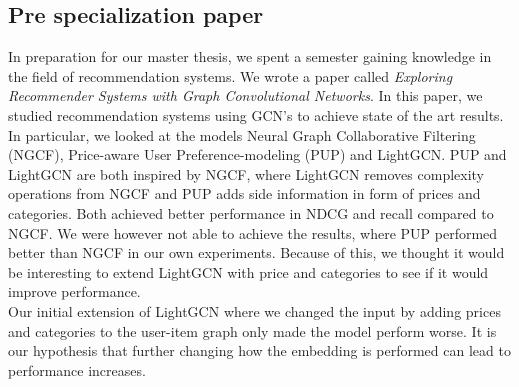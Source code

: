 \subsection{Pre specialization paper}
In preparation for our master thesis, we spent a semester gaining knowledge in the field of recommendation systems.
We wrote a paper called \textit{Exploring Recommender Systems with Graph Convolutional Networks}.
In this paper, we studied recommendation systems using GCN's to achieve state of the art results.
In particular, we looked at the models Neural Graph Collaborative Filtering (NGCF), Price-aware User Preference-modeling (PUP) and LightGCN.
PUP and LightGCN are both inspired by NGCF, where LightGCN removes complexity operations from NGCF and PUP adds side information in form of prices and categories.
Both achieved better performance in NDCG and recall compared to NGCF.
We were however not able to achieve the results, where PUP performed better than NGCF in our own experiments.
Because of this, we thought it would be interesting to extend LightGCN with price and categories to see if it would improve performance.
\\
Our initial extension of LightGCN where we changed the input by adding prices and categories to the user-item graph only made the model perform worse.
It is our hypothesis that further changing how the embedding is performed can lead to performance increases.
